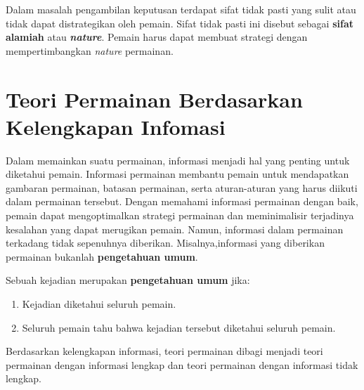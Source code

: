 Dalam masalah pengambilan keputusan terdapat sifat tidak pasti yang sulit atau tidak dapat distrategikan oleh pemain. Sifat tidak pasti ini disebut sebagai \textbf{sifat alamiah} atau \textbf{\textit{nature}}. Pemain harus dapat membuat strategi dengan mempertimbangkan \textit{nature} permainan.

\section{Teori Permainan Berdasarkan Kelengkapan Infomasi}
Dalam memainkan suatu permainan, informasi menjadi hal yang penting untuk diketahui pemain. Informasi permainan membantu pemain untuk mendapatkan gambaran permainan, batasan permainan, serta aturan-aturan yang harus diikuti dalam permainan tersebut. Dengan memahami informasi permainan dengan baik, pemain dapat mengoptimalkan strategi permainan dan meminimalisir terjadinya kesalahan yang dapat merugikan pemain. Namun, informasi dalam permainan terkadang tidak sepenuhnya diberikan. Misalnya,informasi yang diberikan permainan bukanlah \textbf{pengetahuan umum}.

\begin{definisi}
    Sebuah kejadian merupakan \textbf{pengetahuan umum} jika:
    \begin{enumerate}
        \item Kejadian diketahui seluruh pemain.
        \item Seluruh pemain tahu bahwa kejadian tersebut diketahui seluruh pemain.
    \end{enumerate}
\end{definisi}

Berdasarkan kelengkapan informasi, teori permainan dibagi menjadi teori permainan dengan informasi lengkap dan teori permainan dengan informasi tidak lengkap.


